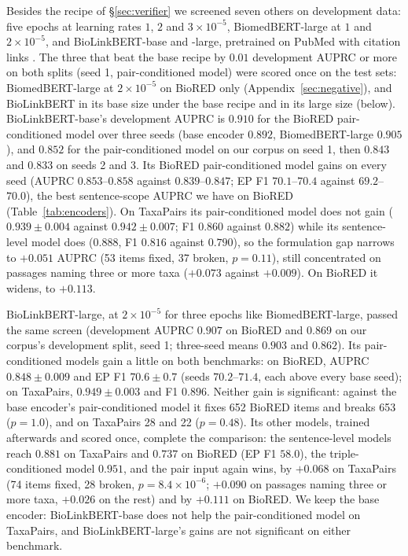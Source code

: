 \documentclass[11pt]{article}
\newcommand{\bench}{\mbox{TaxaPairs}}
\begin{document}
Besides the recipe of \S\ref{sec:verifier} we screened seven others on development data: five
epochs at learning rates $1$, $2$ and $3\times10^{-5}$, BiomedBERT-large at $1$ and
$2\times10^{-5}$, and BioLinkBERT-base and -large, pretrained on PubMed with citation links
\citep{yasunaga2022linkbert}. The three that beat the base recipe by $0.01$ development AUPRC or more
on both splits (seed 1, pair-conditioned model) were scored once on the test sets: BiomedBERT-large
at $2\times10^{-5}$ on BioRED only (Appendix~\ref{sec:negative}), and BioLinkBERT in its base size under the base
recipe and in its large size (below). BioLinkBERT-base's development AUPRC is $0.910$ for the BioRED
pair-conditioned model over three seeds (base encoder $0.892$, BiomedBERT-large $0.905$), and $0.852$
for the pair-conditioned model on our corpus on seed 1, then $0.843$ and $0.833$ on seeds 2 and 3. Its BioRED pair-conditioned model gains on every seed (AUPRC
$0.853$--$0.858$ against $0.839$--$0.847$; EP F1 $70.1$--$70.4$ against $69.2$--$70.0$), the best
sentence-scope AUPRC we have on BioRED (Table~\ref{tab:encoders}). On \bench{} its
pair-conditioned model does not gain ($0.939 \pm 0.004$ against $0.942 \pm 0.007$; F1 $0.860$
against $0.882$) while its sentence-level model does ($0.888$, F1 $0.816$ against $0.790$), so the
formulation gap narrows to $+0.051$ AUPRC (53 items fixed, 37 broken, $p = 0.11$), still
concentrated on passages naming three or more taxa ($+0.073$ against $+0.009$). On BioRED it widens,
to $+0.113$.

BioLinkBERT-large, at $2\times10^{-5}$ for three epochs like BiomedBERT-large, passed the same screen
(development AUPRC $0.907$ on BioRED and $0.869$ on our corpus's development split, seed 1; three-seed means $0.903$ and
$0.862$). Its pair-conditioned models gain a little on both benchmarks: on BioRED, AUPRC
$0.848 \pm 0.009$ and EP F1 $70.6 \pm 0.7$ (seeds $70.2$--$71.4$, each above every base seed); on
\bench{}, $0.949 \pm 0.003$ and F1 $0.896$. Neither gain is significant: against the base encoder's
pair-conditioned model it fixes 652 BioRED items and breaks 653 ($p = 1.0$), and on \bench{} 28 and 22
($p = 0.48$). Its other models, trained afterwards and scored once, complete the comparison: the
sentence-level models reach $0.881$ on \bench{} and $0.737$ on BioRED (EP F1 $58.0$), the
triple-conditioned model $0.951$, and the pair input again wins, by $+0.068$ on \bench{} (74 items
fixed, 28 broken, $p = 8.4\times10^{-6}$; $+0.090$ on passages naming three or more taxa, $+0.026$ on
the rest) and by $+0.111$ on BioRED\@. We keep the base encoder: BioLinkBERT-base does not help the
pair-conditioned model on \bench{}, and BioLinkBERT-large's gains are not significant on either benchmark.
\end{document}

